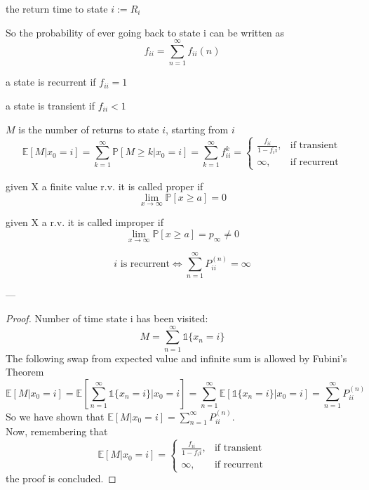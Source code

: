 	\begin{definition}
		the return time to state $i := R_i$
	\end{definition}

	So the probability of ever going back to state i can be written as $$f_{ii} = \sum_{n=1}^\infty f_{ii}(n) $$

	\begin{definition}
		a state is recurrent if $f_{ii} = 1$
	\end{definition}

	\begin{definition}
		a state is transient if  $f_{ii} < 1$
	\end{definition}

	\begin{definition}
		$M$ is the number of returns to state $i$, starting from $i$
		$$\mathbb{E}[M | x_0 = i] = \sum_{k=1}^\infty \mathbb{P}[M\geq k | x_0 = i] = \sum_{k=1}^\infty f_{ii}^k = \begin{cases}
		\frac{f_{ii}}{1-f_ii}, & \mbox{if transient} \\
		\infty, & \mbox{if recurrent}
		\end{cases}$$
	\end{definition}

	\begin{definition}[Proper r.v]
		given X a finite value r.v. it is called proper if $$\lim_{x\to \infty} \mathbb{P}[x\geq a] = 0$$
	\end{definition}

	\begin{definition}[Improper r.v]
		given X a r.v. it is called improper if  $$\lim_{x\to \infty} \mathbb{P}[x\geq a] = p_\infty \ne 0$$
	\end{definition}

	\begin{theorem}
		$$i  \mbox{ is recurrent} \iff \sum_{n=1}^\infty P_{ii}^{(n)} = \infty$$
	\end{theorem}
	---

	\begin{proof}
		Number of time state i has been visited: $$M = \sum_{n=1}^\infty \mathds{1}\{x_n =i\} $$
		The following swap from expected value and infinite sum is allowed by Fubini's Theorem$$ \mathbb{E}[M | x_0 = i] = \mathbb{E}[\sum_{n=1}^\infty \mathds{1}\{x_n = i\} | x_0 = i] = \sum_{n=1}^\infty \mathbb{E}[\mathds{1}\{ x_n = i\} | x_0 = i] = \sum_{n=1}^\infty P_{ii}^{(n)} $$
		So we have shown that $\mathbb{E}[M | x_0=i] = \sum_{n=1}^\infty P_{ii}^{(n)}$.\\
		Now, remembering that$$ \mathbb{E}[M | x_0 = i] = \begin{cases}
		\frac{f_{ii}}{1-f_ii}, & \mbox{if transient} \\
		\infty, & \mbox{if recurrent}
		\end{cases}$$
		the proof is concluded.
	\end{proof}

